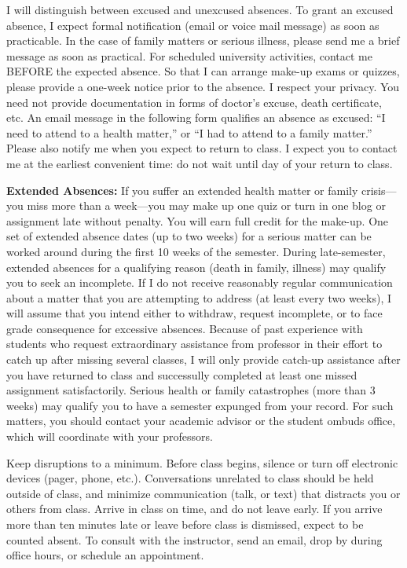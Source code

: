 \documentclass[]{article}
\begin{document}
I will distinguish between excused and unexcused absences. To grant an
excused absence, I expect formal notification (email or voice mail
message) as soon as practicable. In the case of family matters or
serious illness, please send me a brief message as soon as practical.
For scheduled university activities, contact me BEFORE the expected
absence. So that I can arrange make-up exams or quizzes, please provide
a one-week notice prior to the absence. I respect your privacy. You need
not provide documentation in forms of doctor's excuse, death
certificate, etc. An email message in the following form qualifies an
absence as excused: ``I need to attend to a health matter,'' or ``I had
to attend to a family matter.'' Please also notify me when you expect to
return to class. I expect you to contact me at the earliest convenient
time: do not wait until day of your return to class.

\textbf{Extended Absences:} If you suffer an extended health matter or
family crisis---you miss more than a week---you may make up one quiz or
turn in one blog or assignment late without penalty. You will earn full
credit for the make-up. One set of extended absence dates (up to two
weeks) for a serious matter can be worked around during the first 10
weeks of the semester. During late-semester, extended absences for a
qualifying reason (death in family, illness) may qualify you to seek an
incomplete. If I do not receive reasonably regular communication about a
matter that you are attempting to address (at least every two weeks), I
will assume that you intend either to withdraw, request incomplete, or
to face grade consequence for excessive absences. Because of past
experience with students who request extraordinary assistance from
professor in their effort to catch up after missing several classes, I
will only provide catch-up assistance after you have returned to class
and successully completed at least one missed assignment satisfactorily.
Serious health or family catastrophes (more than 3 weeks) may qualify
you to have a semester expunged from your record. For such matters, you
should contact your academic advisor or the student ombuds office, which
will coordinate with your professors.

Keep disruptions to a minimum. Before class begins, silence or turn off
electronic devices (pager, phone, etc.). Conversations unrelated to
class should be held outside of class, and minimize communication (talk,
or text) that distracts you or others from class. Arrive in class on
time, and do not leave early. If you arrive more than ten minutes late
or leave before class is dismissed, expect to be counted absent. To
consult with the instructor, send an email, drop by during office hours,
or schedule an appointment.
\end{document}
